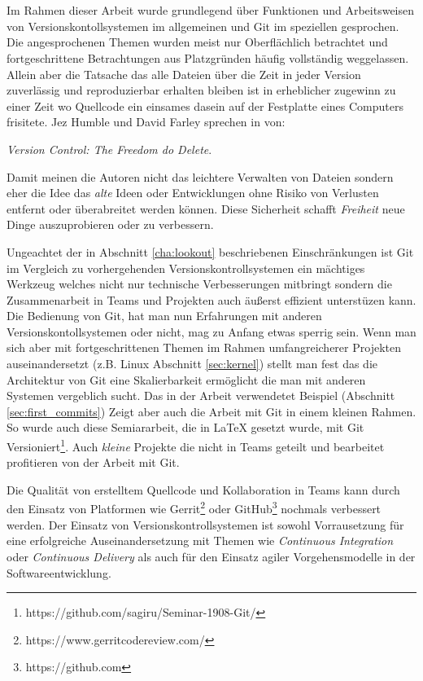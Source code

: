 \chapter{\result}\label{cha:result}
Im Rahmen dieser Arbeit wurde grundlegend über Funktionen und Arbeitsweisen von
Versionskontollsystemen im allgemeinen und Git im speziellen gesprochen. Die
angesprochenen Themen wurden meist nur Oberflächlich betrachtet und
fortgeschrittene Betrachtungen aus Platzgründen häufig vollständig weggelassen.
Allein aber die Tatsache das alle Dateien über die Zeit in jeder Version
zuverlässig und reproduzierbar erhalten bleiben ist in erheblicher zugewinn zu
einer Zeit wo Quellcode ein einsames dasein auf der Festplatte eines Computers
frisitete. Jez Humble und David Farley sprechen in \cite[S.~35]{cd} von:

\begin{center}
\textit{\glqq{}Version Control: The Freedom do Delete}.
\end{center}

Damit meinen die Autoren nicht das leichtere Verwalten von Dateien sondern eher
die Idee das \textit{alte} Ideen oder Entwicklungen ohne Risiko von Verlusten
entfernt oder überabreitet werden können. Diese Sicherheit schafft
\textit{Freiheit} neue Dinge auszuprobieren oder zu verbessern.

Ungeachtet der in Abschnitt \ref{cha:lookout} beschriebenen Einschränkungen ist
Git im Vergleich zu vorhergehenden Versionskontrollsystemen ein mächtiges
Werkzeug welches nicht nur technische Verbesserungen mitbringt sondern die
Zusammenarbeit in Teams und Projekten auch äußerst effizient unterstüzen kann.
Die Bedienung von Git, hat man nun Erfahrungen mit anderen
Versionskontollsystemen oder nicht, mag zu Anfang etwas sperrig sein.  Wenn man
sich aber mit fortgeschrittenen Themen im Rahmen umfangreicherer Projekten
auseinandersetzt (z.B. Linux Abschnitt \ref{sec:kernel}) stellt man fest das
die Architektur von Git eine Skalierbarkeit ermöglicht die man mit anderen
Systemen vergeblich sucht. Das in der Arbeit verwendetet Beispiel (Abschnitt
\ref{sec:first_commits}) Zeigt aber auch die Arbeit mit Git in einem kleinen Rahmen. So wurde
auch diese Semiararbeit, die in LaTeX gesetzt wurde, mit Git
Versioniert\footnote{https://github.com/sagiru/Seminar-1908-Git/}. Auch
\textit{kleine} Projekte die nicht in Teams geteilt und bearbeitet profitieren
von der Arbeit mit Git.

Die Qualität von erstelltem Quellcode und Kollaboration in Teams kann durch den
Einsatz von Platformen wie Gerrit\footnote{https://www.gerritcodereview.com/}
oder GitHub\footnote{https://github.com} nochmals verbessert werden. Der
Einsatz von Versionskontrollsystemen ist sowohl Vorrausetzung für eine
erfolgreiche Auseinandersetzung mit Themen wie \textit{Continuous Integration}
oder \textit{Continuous Delivery} als auch für den Einsatz agiler
Vorgehensmodelle in der Softwareentwicklung.\cite{cd}

